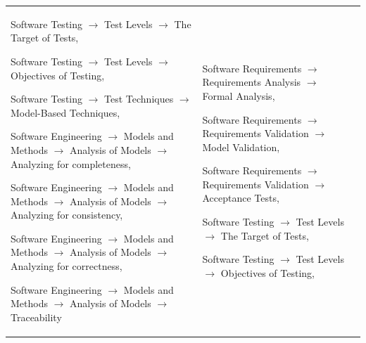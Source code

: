 \begin{small}
\begin{longtable}[h]{p{0.45cm}|p{}|p{}}
Software Testing $\rightarrow$ Test Levels $\rightarrow$ The
Target of Tests,

Software Testing $\rightarrow$ Test Levels $\rightarrow$ Objectives
of Testing,

Software Testing $\rightarrow$ Test Techniques $\rightarrow$
Model-Based Techniques,

Software Engineering $\rightarrow$ Models and Methods $\rightarrow$
Analysis of Models $\rightarrow$ Analyzing for completeness,

Software Engineering $\rightarrow$ Models and Methods $\rightarrow$
Analysis of Models $\rightarrow$ Analyzing for consistency,

Software Engineering $\rightarrow$ Models and Methods $\rightarrow$
Analysis of Models $\rightarrow$ Analyzing for correctness,

Software Engineering $\rightarrow$ Models and Methods $\rightarrow$
Analysis of Models $\rightarrow$ Traceability  & Software Requirements $\rightarrow$ Requirements Analysis $\rightarrow$
Formal Analysis,

Software Requirements $\rightarrow$ Requirements Validation $\rightarrow$
Model Validation,

Software Requirements $\rightarrow$ Requirements Validation $\rightarrow$
Acceptance Tests,

Software Testing $\rightarrow$ Test Levels $\rightarrow$ The
Target of Tests,

Software Testing $\rightarrow$ Test Levels $\rightarrow$ Objectives
of Testing,


\end{longtable}
\end{small}
